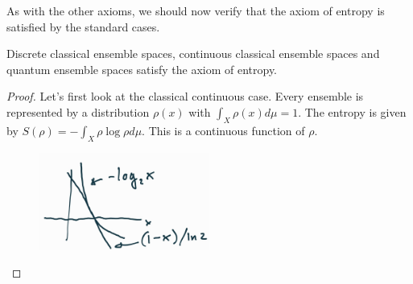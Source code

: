 As with the other axioms, we should now verify that the axiom of entropy is satisfied by the standard cases.

\begin{mathSection}
	\begin{prop}
		Discrete classical ensemble spaces, continuous classical ensemble spaces and quantum ensemble spaces satisfy the axiom of entropy.
	\end{prop}
	
	\begin{proof}
		Let's first look at the classical continuous case. Every ensemble is represented by a distribution $\rho(x)$ with $\int_X \rho(x) d\mu=1$. The entropy is given by $S(\rho) = - \int_X \rho \log \rho d\mu$. This is a continuous function of $\rho$.
		
		\begin{figure}[H]
			\centering
			\includegraphics[width=0.5\textwidth]{tempimages/LogBound.jpg}
		\end{figure}
		

\end{proof}
\end{mathSection}
